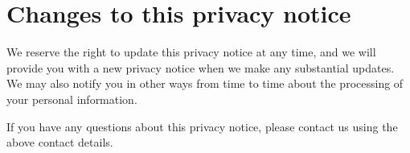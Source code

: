 \documentclass[12pt]{article}
\begin{document}
\section*{Changes to this privacy notice}
We reserve the right to update this privacy notice at any time, and we will provide you with a new privacy notice when we make any substantial updates. We may also notify you in other ways from time to time about the processing of your personal information. 

If you have any questions about this privacy notice, please contact us using the above contact details.
\end{document}
